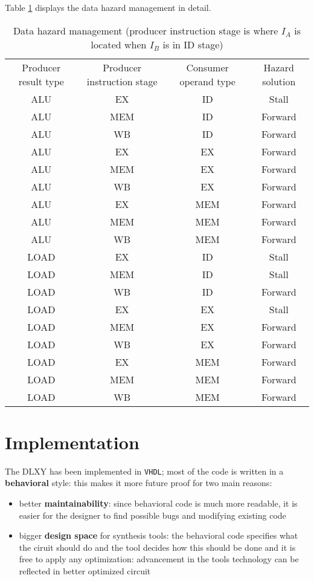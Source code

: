 \bigskip
Table \ref{tab:data_hazard} displays the data hazard management in detail.

\begin{table}[H]
	\centering
	\begin{tabular}{cccc}
		\hline
		\rowcolor{gray!50}
		Producer result type & Producer instruction stage &
			Consumer operand type & Hazard solution \\
		ALU &	EX &	ID &	Stall \\
		\rowcolor{gray!25}
		ALU &	MEM &	ID &	Forward \\
		ALU &	WB &	ID &	Forward \\
		\hdashline
		\rowcolor{gray!25}
		ALU & 	EX &	EX &	Forward \\
		ALU & 	MEM &	EX &	Forward \\
		\rowcolor{gray!25}
		ALU & 	WB &	EX &	Forward \\
		\hdashline
		ALU & 	EX &	MEM &	Forward \\
		\rowcolor{gray!25}
		ALU & 	MEM &	MEM &	Forward \\
		ALU & 	WB &	MEM &	Forward \\
		\hdashline
		\rowcolor{gray!25}
		LOAD & 	EX &	ID &	Stall \\
		LOAD & 	MEM &	ID &	Stall \\
		\rowcolor{gray!25}
		LOAD & 	WB &	ID &	Forward \\
		\hdashline
		LOAD & 	EX &	EX &	Stall \\
		\rowcolor{gray!25}
		LOAD & 	MEM &	EX &	Forward \\
		LOAD & 	WB &	EX &	Forward \\
		\hdashline
		\rowcolor{gray!25}
		LOAD & 	EX &	MEM &	Forward \\
		LOAD & 	MEM &	MEM &	Forward \\
		\rowcolor{gray!25}
		LOAD & 	WB &	MEM &	Forward \\
		\hline
	\end{tabular}
	\caption{Data hazard management (producer instruction stage is where
		$I_A$ is located when $I_B$ is in ID stage)}
	\label{tab:data_hazard}
\end{table}

\section{Implementation}
The DLXY has been implemented in \texttt{VHDL}; most of the code is written in a
\textbf{behavioral} style: this makes it more future proof for two main reasons:
\begin{itemize}
	\item better \textbf{maintainability}: since behavioral code is much
		more readable, it is easier for the designer to find possible
		bugs and modifying existing code
	\item bigger \textbf{design space} for synthesis tools: the behavioral
		code specifies what the ciruit should do and the tool decides
		how this should be done and it is free to apply any optimization:
		advancement in the tools technology can be reflected in better
		optimized circuit
\end{itemize}


